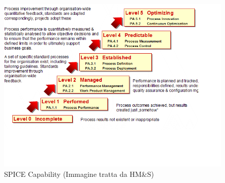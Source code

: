 \begin{figure}[!ht]
	\begin{center}
		\includegraphics[width=1\linewidth]{../immagini/Process_Level.jpg}
		\caption{SPICE Capability (Immagine tratta da HM\&S)}
	\end{center}
\end{figure}


	